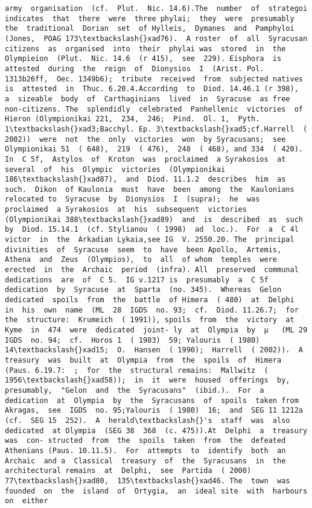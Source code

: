 \documentclass[11pt]{article}
\begin{document}
\begin{Verbatim}[commandchars=\\\{\}]
army  organisation  (cf.  Plut.  Nic. 14.6).The  number  of  strategoi  indicates  that  there  were  three phylai;  they  were  presumably  the  traditional  Dorian  set  of Hylleis,  Dymanes  and  Pamphyloi  (Jones,  POAG 173\textbackslash{}xad76).  A roster  of  all  Syracusan  citizens  as  organised  into  their  phylai was  stored  in  the  Olympieion  (Plut.  Nic. 14.6  (r 415),  see  229). Eisphora  is  attested  during  the  reign  of  Dionysios  I  (Arist. Pol. 1313b26ff,  Oec. 1349b6);  tribute  received  from  subjected natives  is  attested  in  Thuc. 6.20.4.According  to  Diod. 14.46.1 (r 398),  a  sizeable  body  of  Carthaginians  lived  in  Syracuse  as free  non-citizens. The  splendidly  celebrated  Panhellenic  victories  of  Hieron (Olympionikai 221,  234,  246;  Pind.  Ol. 1,  Pyth. 1\textbackslash{}xad3;Bacchyl. Ep. 3\textbackslash{}xad5;cf.Harrell  ( 2002))  were  not  the  only  victories  won  by Syracusans;  see  Olympionikai 51  ( 648),  219  ( 476),  248  ( 468), and 334  ( 420).  In  C 5f,  Astylos  of  Kroton  was  proclaimed  a Syrakosios  at  several  of  his  Olympic  victories  (Olympionikai 186\textbackslash{}xad87),  and  Diod. 11.1.2  describes  him  as  such.  Dikon  of Kaulonia  must  have  been  among  the  Kaulonians  relocated to  Syracuse  by  Dionysios  I  (supra);  he  was  proclaimed  a Syrakosios  at  his  subsequent  victories  (Olympionikai 388\textbackslash{}xad89)  and  is  described  as  such  by  Diod. 15.14.1  (cf. Stylianou  ( 1998)  ad  loc.).  For  a  C 4l  victor  in  the  Arkadian Lykaia,see IG  V. 2550.20. The  principal  divinities  of  Syracuse  seem  to  have  been Apollo,  Artemis,  Athena  and  Zeus  (Olympios),  to  all  of whom  temples  were  erected  in  the  Archaic  period  (infra). All  preserved  communal  dedications  are  of  C 5.  IG v.1217 is  presumably  a  C 5f  dedication  by  Syracuse  at  Sparta  (no. 345).  Whereas  Gelon  dedicated  spoils  from  the  battle  of Himera  ( 480)  at  Delphi  in  his  own  name  (ML  28  IGDS  no. 93;  cf.  Diod. 11.26.7;  for  the  structure:  Krumeich  ( 1991)), spoils  from  the  victory  at  Kyme  in  474  were  dedicated  joint- ly  at  Olympia  by  µ   (ML 29  IGDS  no. 94;  cf.  Horos 1  ( 1983)  59; Yalouris  ( 1980)  14\textbackslash{}xad15;  O.  Hansen  ( 1990);  Harrell  ( 2002)).  A treasury  was  built  at  Olympia  from  the  spoils  of  Himera (Paus. 6.19.7:  ;  for  the  structural remains:  Mallwitz  ( 1956\textbackslash{}xad58));  in  it  were  housed  offerings  by,  presumably,  "Gelon  and  the  Syracusans"  (ibid.).  For  a dedication  at  Olympia  by  the  Syracusans  of  spoils  taken from  Akragas,  see  IGDS  no. 95;Yalouris  ( 1980)  16;  and  SEG 11 1212a  (cf.  SEG 15  252).  A  herald\textbackslash{}'s  staff  was  also  dedicated  at Olympia  (SEG 38  368  (c. 475)).At  Delphi  a  treasury  was  con- structed  from  the  spoils  taken  from  the  defeated  Athenians (Paus. 10.11.5).  For  attempts  to  identify  both  an  Archaic  and a  Classical  treasury  of  the  Syracusans  in  the  architectural remains  at  Delphi,  see  Partida  ( 2000)  77\textbackslash{}xad80,  135\textbackslash{}xad46. The  town  was  founded  on  the  island  of  Ortygia,  an  ideal site  with  harbours  on  either 
\end{Verbatim}
\end{document}
